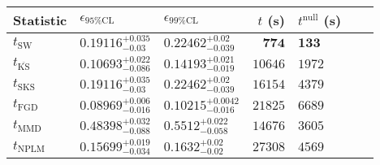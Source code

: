 \begin{tabular}{l|llr|llr}
Statistic & $\epsilon_{95\%\mathrm{CL}}$ & $\epsilon_{99\%\mathrm{CL}}$ & $t$ (s) & $t^{\mathrm{null}}$ (s) \\
	\midrule
	$t_{\mathrm{SW}}$ & $0.19116_{-0.03}^{+0.035}$ & $0.22462_{-0.039}^{+0.02}$ & ${\mathbf{774}}$ & ${\mathbf{133}}$ \\
	$t_{\overline{\mathrm{KS}}}$ & $0.10693_{-0.086}^{+0.022}$ & $0.14193_{-0.019}^{+0.021}$ & $10646$ & $1972$ \\
	$t_{\mathrm{SKS}}$ & $0.19116_{-0.03}^{+0.035}$ & $0.22462_{-0.039}^{+0.02}$ & $16154$ & $4379$ \\
	$t_{\mathrm{FGD}}$ & ${\mathbf{0.08969_{-0.016}^{+0.006}}}$ & ${\mathbf{0.10215_{-0.016}^{+0.0042}}}$ & $21825$ & $6689$ \\
	$t_{\mathrm{MMD}}$ & $0.48398_{-0.088}^{+0.032}$ & $0.5512_{-0.058}^{+0.022}$ & $14676$ & $3605$ \\
\rowcolor{red!35}	$t_{\mathrm{NPLM}}$ & $0.15699_{-0.034}^{+0.019}$ & $0.1632_{-0.02}^{+0.02}$ & $27308$ & $4569$ \\
	\bottomrule
\end{tabular}